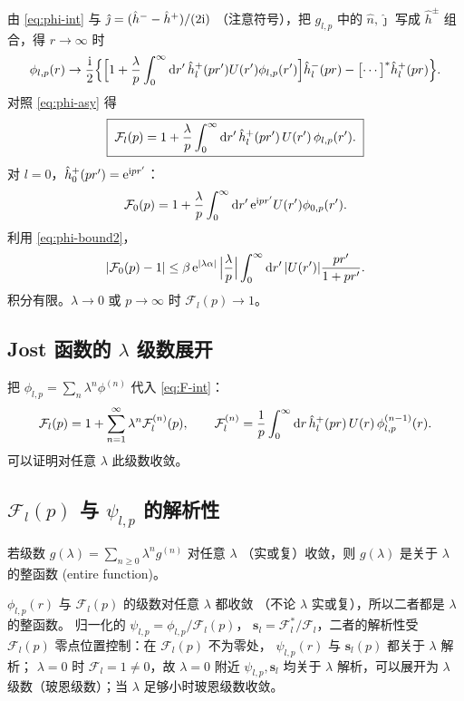 由 \eqref{eq:phi-int} 与 $\hat\jmath=(\hat h^- -\hat h^+)/(2\mathrm{i})$
（注意符号），把 $g_{l,p}$ 中的 $\hat n,\hat\jmath$ 写成 $\hat h^\pm$
组合，得 $r\to\infty$ 时
\begin{equation}
\phi_{l,p}(r)\to\frac{\mathrm{i}}{2}\Bigl\{\Bigl[1+\frac{\lambda}{p}\int_0^\infty\mathrm{d} r'\,
\hat h_l^+(pr')U(r')\phi_{l,p}(r')\Bigr]\hat h_l^-(pr)
-\bigl[\cdots\bigr]^*\hat h_l^+(pr)\Bigr\}.
\end{equation}
对照 \eqref{eq:phi-asy} 得
\begin{equation}\label{eq:F-int}
\boxed{\;\mathcal F_l(p)= 1+\frac{\lambda}{p}\int_0^\infty\mathrm{d} r'\,
\hat h_l^+(pr')\,U(r')\,\phi_{l,p}(r').\;}
\end{equation}
对 $l=0$，$\hat h_0^+(pr')=\mathrm{e}^{\mathrm{i} pr'}$：
\begin{equation}
\mathcal F_0(p)=1+\frac{\lambda}{p}\int_0^\infty \mathrm{d} r'\,\mathrm{e}^{\mathrm{i} pr'}U(r')\phi_{0,p}(r').
\end{equation}
利用 \eqref{eq:phi-bound2}，
\begin{equation}\label{eq:F-bound}
|\mathcal F_0(p)-1|\le \beta\,\mathrm{e}^{|\lambda\alpha|}\,
\Bigl|\frac{\lambda}{p}\Bigr|\int_0^\infty\mathrm{d} r'\,|U(r')|\frac{pr'}{1+pr'}.
\end{equation}
积分有限。$\lambda\to0$ 或 $p\to\infty$ 时 $\mathcal F_l(p)\to 1$。

\subsection{Jost 函数的 $\lambda$ 级数展开}

把 $\phi_{l,p}=\sum_n\lambda^n\phi^{(n)}$ 代入 \eqref{eq:F-int}：
\begin{equation}\label{eq:F-series}
\mathcal F_l(p)=1+\sum_{n=1}^\infty \lambda^n\mathcal F_l^{(n)}(p),
\qquad
\mathcal F_l^{(n)}=\frac{1}{p}\int_0^\infty \mathrm{d} r\,\hat h_l^+(pr)\,U(r)\,\phi_{l,p}^{(n-1)}(r).
\end{equation}
可以证明对任意 $\lambda$ 此级数收敛。

\subsection{$\mathcal F_l(p)$ 与 $\psi_{l,p}$ 的解析性}

\begin{theorem}\label{thm:entire}
若级数 $g(\lambda)=\sum_{n\ge0}\lambda^n g^{(n)}$ 对任意 $\lambda$
（实或复）收敛，则 $g(\lambda)$ 是关于 $\lambda$ 的整函数 (entire
function)。
\end{theorem}
$\phi_{l,p}(r)$ 与 $\mathcal F_l(p)$ 的级数对任意 $\lambda$ 都收敛
（不论 $\lambda$ 实或复），所以二者都是 $\lambda$ 的整函数。
归一化的 $\psi_{l,p}=\phi_{l,p}/\mathcal F_l(p)$，
$\mathbf s_l=\mathcal F_l^*/\mathcal F_l$，二者的解析性受
$\mathcal F_l(p)$ 零点位置控制：在 $\mathcal F_l(p)$ 不为零处，
$\psi_{l,p}(r)$ 与 $\mathbf s_l(p)$ 都关于 $\lambda$ 解析；
$\lambda=0$ 时 $\mathcal F_l=1\ne0$，故 $\lambda=0$ 附近
$\psi_{l,p},\mathbf s_l$ 均关于 $\lambda$ 解析，可以展开为
$\lambda$ 级数（玻恩级数）；当 $\lambda$ 足够小时玻恩级数收敛。

